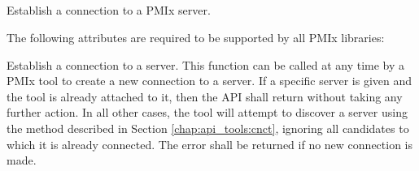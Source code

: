 {%
\subsection{}

\summary

Establish a connection to a \ac{PMIx} server.

\format


\begin{arglist}
\end{arglist}

\returnsimple

\reqattrstart
The following attributes are required to be supported by all \ac{PMIx} libraries:


\reqattrend

\descr

Establish a connection to a server. This function can be called at any time by a \ac{PMIx} tool to create a new connection to a server. If a specific server is given and the tool is already attached to it, then the \ac{API} shall return  without taking any further action. In all other cases, the tool will attempt to discover a server using the method described in Section \ref{chap:api_tools:cnct}, ignoring all candidates to which it is already connected. The  error shall be returned if no new connection is made.

}
